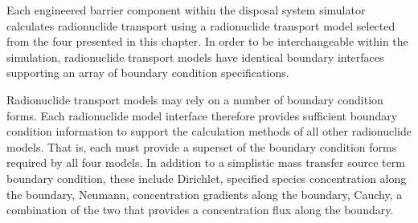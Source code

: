 Each engineered barrier component within the \Cyder disposal system simulator calculates 
radionuclide transport using a radionuclide transport model selected from the four presented in this 
chapter. In order to be interchangeable within the simulation, radionuclide 
transport models have identical boundary interfaces supporting an array of 
boundary condition specifications. 

Radionuclide transport models may rely on a number of boundary condition forms.  
Each radionuclide model interface therefore provides sufficient boundary condition 
information to support the calculation methods of all other radionuclide models. That 
is, each must provide a superset of the boundary condition forms required by all 
four models. In addition to a simplistic mass transfer source term boundary 
condition, these include Dirichlet, specified species concentration along the 
boundary, Neumann, concentration gradients along the boundary, Cauchy, a 
combination of the two that provides a concentration flux along the boundary.
